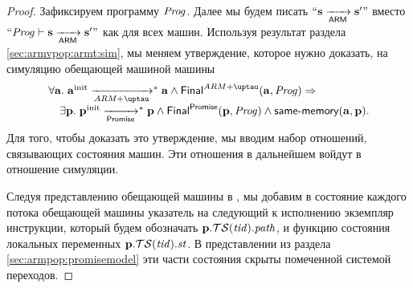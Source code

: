 \newcommand{\TSfprom}{\TSf}
\begin{proof}
  Зафиксируем программу $\mathit{Prog}$. Далее мы будем писать $``\mathbf{s} \xrightarrow[\mathsf{ARM}]{} \mathbf{s}'"$ вместо
  $``\mathit{Prog} \vdash \mathbf{s} \xrightarrow[\mathsf{ARM}]{} \mathbf{s}'"$ как для всех машин.
  Используя результат раздела \ref{sec:armvpop:armt:sim}, мы меняем утверждение, которое нужно
  доказать, на симуляцию обещающей машиной машины \ARMt
\[\begin{array}{l}
  \forall \aT. \; \ainit \armStep^{*} \aT \land \finalStateA(\aT, \Cfarm) \Rightarrow \\
  \quad \exists \p. \; \pinit \promStep^{*} \p \land \finalStateProm(\p, \Cfprom) \land \sameMemory(\aT, \p). \\
\end{array}\]
Для того, чтобы доказать это утверждение, мы вводим набор отношений, связывающих
состояния машин. Эти отношения в дальнейшем войдут в отношение симуляции.

Следуя представлению обещающей машины в \cite{Podkopaev-al:ECOOP17}, мы добавим в состояние
каждого потока обещающей машины указатель на следующий к исполнению экземпляр инструкции,
который будем обозначать $\mathbf{p}.\mathcal{TS}(\mathit{tid}).\mathit{path}$, и функцию состояния локальных
переменных $\mathbf{p}.\mathcal{TS}(\mathit{tid}).\mathit{st}$.
В представлении из раздела \ref{sec:armpop:promisemodel} эти части состояния скрыты
помеченной системой переходов.


\end{proof}
